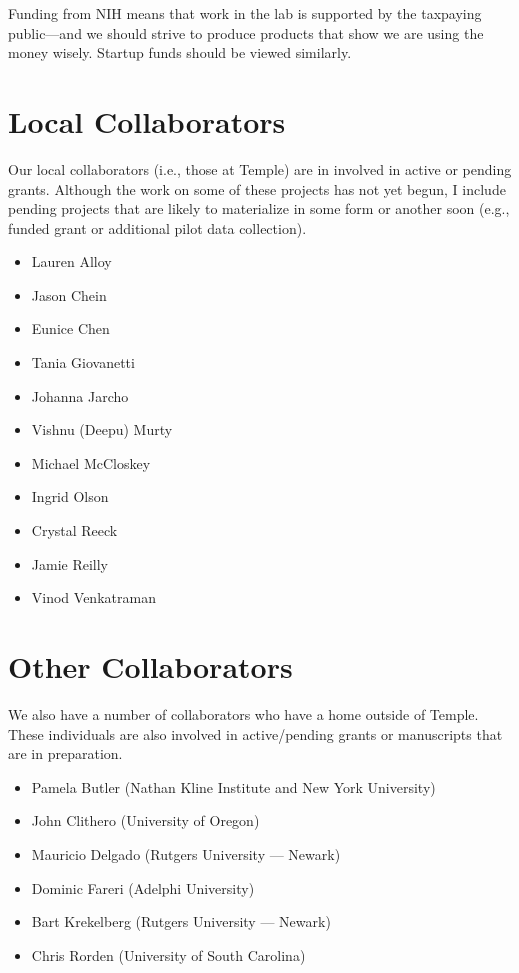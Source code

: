 \documentclass[letterpaper,12pt,oneside]{memoir}
\begin{document}
Funding from NIH means that work in the lab is supported by the taxpaying public---and we should strive to produce products that show we are using the money wisely. Startup funds should be viewed similarly. 

\section{Local Collaborators}
Our local collaborators (i.e., those at Temple) are in involved in active or pending grants. Although the work on some of these projects has not yet begun, I include pending projects that are likely to materialize in some form or another soon (e.g., funded grant or additional pilot data collection).

\begin{multicols}{2}
\begin{itemize}[noitemsep,nolistsep]
\item Lauren Alloy
\item Jason Chein
\item Eunice Chen
\item Tania Giovanetti
\item Johanna Jarcho
\item Vishnu (Deepu) Murty
\item Michael McCloskey
\item Ingrid Olson
\item Crystal Reeck
\item Jamie Reilly
\item Vinod Venkatraman
\end{itemize}
\end{multicols}

\section{Other Collaborators}

We also have a number of collaborators who have a home outside of Temple. These individuals are also involved in active/pending grants or manuscripts that are in preparation. \\

\begin{itemize}[noitemsep,nolistsep]
\item Pamela Butler (Nathan Kline Institute and New York University)
\item John Clithero (University of Oregon)
\item Mauricio Delgado (Rutgers University --- Newark)
\item Dominic Fareri (Adelphi University)
\item Bart Krekelberg (Rutgers University --- Newark)
\item Chris Rorden (University of South Carolina) 
\end{itemize}
\end{document}
